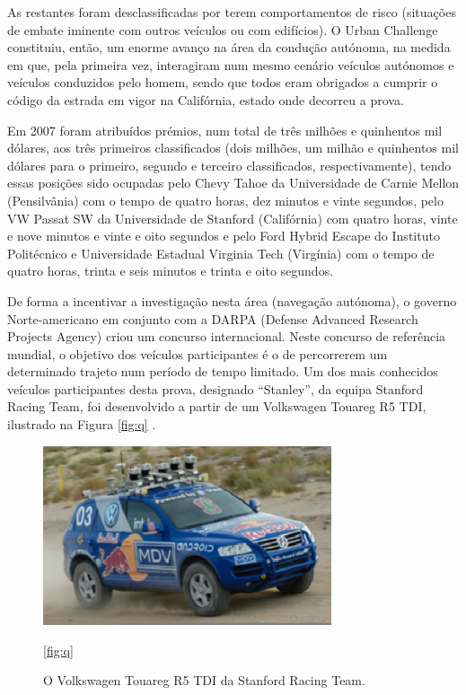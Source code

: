 \documentclass[a4paper,10pt]{texRel}
\begin{document}
As restantes foram desclassificadas por terem comportamentos de risco (situações de embate iminente com outros veículos ou com edifícios). O Urban Challenge constituiu, então, um enorme avanço na área da condução autónoma, na medida em que, pela primeira vez, interagiram num mesmo cenário veículos autónomos e veículos conduzidos pelo homem, sendo que todos eram obrigados a cumprir o código da estrada em vigor na Califórnia, estado onde decorreu a prova.

Em 2007 foram atribuídos prémios, num total de três milhões e quinhentos mil dólares, aos três primeiros classificados (dois milhões, um milhão e quinhentos mil dólares para o primeiro, segundo e terceiro classificados, respectivamente), tendo essas posições sido ocupadas pelo Chevy Tahoe da Universidade de Carnie Mellon (Pensilvânia) com o tempo de quatro horas, dez minutos e vinte segundos, pelo VW Passat SW da Universidade de Stanford (Califórnia) com quatro horas, vinte e nove minutos e vinte e oito segundos e pelo Ford Hybrid Escape do Instituto Politécnico e Universidade Estadual Virginia Tech (Virgínia) com o tempo de quatro horas, trinta e seis minutos e trinta e oito segundos.


De forma a incentivar a investigação nesta área (navegação autónoma), o governo Norte-americano em conjunto com a DARPA (Defense Advanced Research Projects Agency) criou um concurso internacional. Neste concurso de referência mundial, o objetivo dos veículos participantes é o de percorrerem um determinado trajeto num período de tempo limitado. Um dos mais conhecidos veículos participantes desta prova, designado “Stanley”, da equipa Stanford Racing Team, foi desenvolvido a partir de um Volkswagen Touareg R5 TDI, ilustrado na Figura \ref{fig:q} . 

\begin{figure}[H]
\centering
\includegraphics[width=85mm,scale=0.8]{imagens/cap2/stanley.png}
\caption{ O  Volkswagen Touareg R5 TDI da Stanford Racing Team.}
\label{fig_stanley1} \ref{fig:q}
\end{figure}
\end{document}

